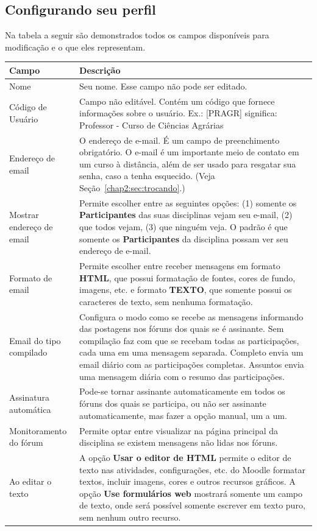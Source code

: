 \subsection{Configurando seu perfil}
Na tabela a seguir são demonstrados todos os campos disponíveis para modificação e o que eles representam.

\begin{longtable}{p{4cm}|p{9cm}}
\hline
   \rowcolor[rgb]{0.8,0.8,0.8}  \textbf{Campo} & \textbf{Descrição}\\
    \hline
    Nome  & Seu nome. Esse campo não pode ser editado. \\\hline
    Código de Usuário & Campo não editável. Contém um código que fornece informações sobre o usuário. Ex.: [PRAGR] significa:  Professor -  Curso de Ciências Agrárias  \\\hline
    Endereço de email & O endereço de e-mail. É um campo de preenchimento obrigatório. O e-mail é um importante meio de contato em um curso à distância, além de ser usado para resgatar sua senha, caso a tenha esquecido. (Veja Seção~\ref{chap2:sec:trocando}.) \\\hline
    Mostrar endereço de email & Permite escolher entre as seguintes opções: (1) somente os \textbf{Participantes} das suas disciplinas vejam seu e-mail, (2) que todos vejam, (3) que ninguém veja. O padrão é que somente os \textbf{Participantes} da disciplina possam ver seu endereço de e-mail. \\\hline
    Formato de email & Permite escolher entre receber mensagens em formato \textbf{HTML}, que possui formatação de fontes, cores de fundo, imagens, etc. e formato \textbf{TEXTO}, que somente possui os caracteres de texto, sem nenhuma formatação. \\\hline
    Email do tipo compilado & Configura o modo como se recebe as mensagens informando das postagens nos fóruns dos quais se é assinante. Sem compilação faz com que se recebam todas as participações, cada uma em uma mensagem separada. Completo envia um email diário com as participações completas. Assuntos envia uma mensagem diária com o resumo das participações. \\\hline
    Assinatura automática & Pode-se tornar assinante automaticamente em todos os fóruns dos quais se participa, ou não ser assinante automaticamente, mas fazer a opção manual, um a um. \\\hline
    Monitoramento do fórum & Permite optar entre visualizar na página principal da disciplina se existem mensagens não lidas nos fóruns. 
    \\\hline
    Ao editar o texto & A opção \textbf{Usar o editor de HTML} permite o editor de texto nas atividades, configurações, etc. do Moodle formatar textos, incluir imagens, cores e outros recursos gráficos. A opção \textbf{Use formulários web} mostrará somente um campo de texto, onde será possível somente escrever em texto puro, sem nenhum outro recurso. \\\hline
 

\end{longtable}

